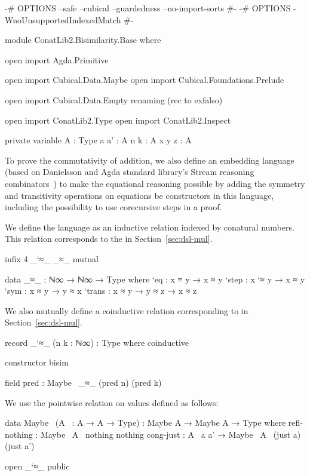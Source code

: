 \begin{code}[hide]
{-# OPTIONS --safe --cubical --guardedness --no-import-sorts #-}
{-# OPTIONS -WnoUnsupportedIndexedMatch #-}

module ConatLib2.Bisimilarity.Base where

open import Agda.Primitive

open import Cubical.Data.Maybe
open import Cubical.Foundations.Prelude

open import Cubical.Data.Empty
  renaming (rec to exfalso)

open import ConatLib2.Type
open import ConatLib2.Inspect

private variable
  A : Type
  a a' : A
  n k : A
  x y z : A
\end{code}
To prove the commutativity of addition, we also define an embedding language
(based on Danielsson \cite{danielsson-beating} and Agda standard library's
Stream reasoning combinators~\cite{agda-stdlib}) to make the equational
reasoning possible by adding the symmetry and transitivity operations on
equations be constructors in this language, including the possibility to use
corecursive steps in a proof.

We define the language as an inductive relation indexed by conatural numbers.
This relation corresponds to the  in
Section~\ref{sec:dsl-mul}.
\begin{code}[hide]
infix 4 _`≈_ _≈_
mutual
\end{code}
\begin{code}
  data _≈_ : ℕ∞ → ℕ∞ → Type where
    `eq     : x ≡ y → x ≈ y
    `step   : x `≈ y → x ≈ y
    `sym    : x ≈ y → y ≈ x
    `trans  : x ≈ y → y ≈ z → x ≈ z
\end{code}
\begin{AgdaMultiCode}
We also mutually define a coinductive relation corresponding to
 in Section~\ref{sec:dsl-mul}.
\begin{code}
  record _`≈_ (n k : ℕ∞) : Type where
    coinductive
\end{code}
\begin{code}[hide]
    constructor bisim
\end{code}
\begin{code}
    field
      pred : Maybe~ _≈_ (pred n) (pred k)
\end{code}
\end{AgdaMultiCode}
We use the pointwise relation on  values defined as follows:
\begin{code}
  data Maybe~ (A~ : A → A → Type) :
    Maybe A → Maybe A → Type
    where
      refl-nothing : Maybe~ A~ nothing nothing
      cong-just : A~ a a' → Maybe~ A~ (just a) (just a')
\end{code}
\begin{code}[hide]
open _`≈_ public
\end{code}

